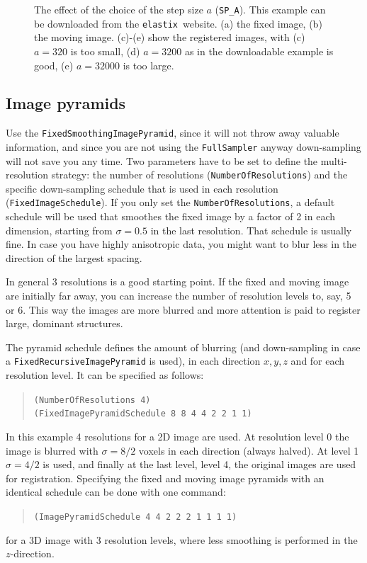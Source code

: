 \documentclass[]{report}
\newcommand{\elastix}{\texttt{elastix}}
\begin{document}
\begin{figure}
\caption{The effect of the choice of the step size $a$ (\texttt{SP\_A}).
This example can be downloaded from the \elastix\ website. (a) the
fixed image, (b) the moving image. (c)-(e) show the registered
images, with (c) $a = 320$ is too small, (d) $a = 3200$ as in the
downloadable example is good, (e) $a = 32000$ is too large.}
\label{fig:stepsize}
\end{figure}

\subsection{Image pyramids}

Use the \texttt{FixedSmoothingImagePyramid}, since it will not throw
away valuable information, and since you are not using the
\texttt{FullSampler} anyway down-sampling will not save you any time.
Two parameters have to be set to define the multi-resolution
strategy: the number of resolutions (\texttt{NumberOfResolutions})
and the specific down-sampling schedule that is used in each
resolution (\texttt{FixedImageSchedule}). If you only set the
\texttt{NumberOfResolutions}, a default schedule will be used that
smoothes the fixed image by a factor of 2 in each dimension, starting
from $\sigma = 0.5$ in the last resolution. That schedule is usually
fine. In case you have highly anisotropic data, you might want to
blur less in the direction of the largest spacing.

In general 3 resolutions is a good starting point. If the fixed and
moving image are initially far away, you can increase the number of
resolution levels to, say, 5 or 6. This way the images are more
blurred and more attention is paid to register large, dominant
structures.

The pyramid schedule defines the amount of blurring (and
down-sampling in case a \texttt{FixedRecursiveImagePyramid} is used),
in each direction $x,y,z$ and for each resolution level. It can be
specified as follows:
\begin{quote}
\texttt{(NumberOfResolutions 4)} \\
\texttt{(FixedImagePyramidSchedule 8 8 4 4 2 2 1 1)}
\end{quote}
In this example 4 resolutions for a 2D image are used. At resolution
level 0 the image is blurred with $\sigma = 8/2$ voxels in each
direction (always halved). At level 1 $\sigma = 4/2$ is used, and
finally at the last level, level 4, the original images are used for
registration. Specifying the fixed and moving image pyramids with an
identical schedule can be done with one command:
\begin{quote}
\texttt{(ImagePyramidSchedule 4 4 2 2 2 1 1 1 1)}
\end{quote}
for a 3D image with 3 resolution levels, where less smoothing is
performed in the $z$-direction.
\end{document}
